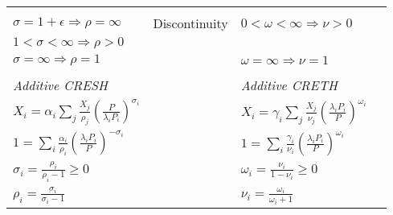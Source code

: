 \begin{table}[ht]
\begin{tabular}{| l | l | l | l |}
\scriptsize $\displaystyle {}$ & \scriptsize{} \\
\scriptsize $\displaystyle \sigma = 1 + \epsilon \Rightarrow \rho = \infty $ & \scriptsize {Discontinuity} &
\scriptsize $\displaystyle 0< \omega < \infty \Rightarrow \nu > 0$ & \scriptsize{} \\
\scriptsize $\displaystyle 1 < \sigma < \infty \Rightarrow \rho > 0$ & \scriptsize {} &
\scriptsize $\displaystyle {}$ & \scriptsize{} \\
\scriptsize $\displaystyle \sigma = \infty \Rightarrow \rho = 1$ & \scriptsize {} &
\scriptsize $\displaystyle \omega = \infty \Rightarrow \nu = 1$ & \scriptsize{} \\
{} & {} & {} & \\
\emph{Additive CRESH}   & {} & \emph{Additive CRETH}  & {} \\
\hline
\scriptsize $\displaystyle X_i = \alpha_i \sum_j{\frac{X_j}{\rho_j}}
	\left( \frac {P} {\lambda_i P_i} \right)^{\sigma_i}$
                      & {} &
\scriptsize $\displaystyle X_i = \gamma_i \sum_j{\frac{X_j}{\nu_j}}
	\left( \frac {\lambda_i P_i} {P} \right)^{\omega_i}$ & {} \\
\scriptsize $\displaystyle 1 = \sum\limits_i
      {\frac{\alpha_i}{\rho_i} \left( \frac{\lambda_i P_i}{P} \right)^{-\sigma_i}}$  & {} &
\scriptsize $\displaystyle 1 = \sum\limits_i
      {\frac{\gamma_i}{\nu_i} \left( \frac{\lambda_i P_i}{P} \right)^{\omega_i}}$  & {} \\
\scriptsize $\displaystyle \sigma_i = \frac{\rho_i}{\rho_i-1} \ge 0$ & {} &
\scriptsize $\displaystyle \omega_i = \frac{\nu_i}{1 - \nu_i} \ge 0$ & {} \\
\scriptsize $\displaystyle \rho_i = \frac{\sigma_i }{\sigma_i - 1} $ & {} &
\scriptsize $\displaystyle \nu_i = \frac{\omega_i}{\omega_i+1} $ & {} \\
\hline
\end{tabular}
\end{table}




\fi
